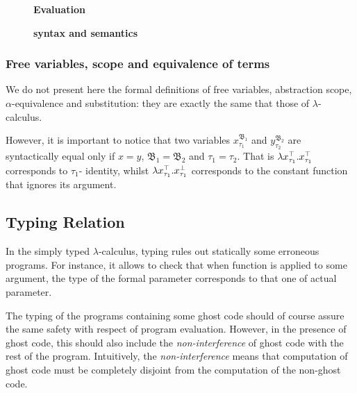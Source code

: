 \begin{figure}[H]
  	 \begin{flushright}  	 \textbf{Evaluation}  	 \end{flushright}
\caption{ \textbf{\glam syntax and semantics} \hfill}
\end{figure}

\subsubsection*{Free variables, scope and equivalence of terms} 
We do not present here the formal definitions of free variables, 
abstraction scope, $\alpha$-equivalence and substitution: they are exactly 
the same that those of $\lambda$-calculus.

However, it is important to notice that two variables $x^{\mathfrak{B_{1}}}_{\tau_{1}}$ and  
$y^{\mathfrak{B_{2}}}_{\tau_{2}}$ are syntactically equal only if 
$x = y$, $\mathfrak{B_{1}} = \mathfrak{B_{2}}$ and $ \tau_{1} = \tau_{2} $. That is  $\lambda x^{\top}_{\tau_{1}}. x^{\top}_{\tau_{1}}$ corresponds to $\tau_{1}$- identity, whilst  $\lambda x^{\top}_{\tau_{1}}. x^{\bot}_{\tau_{1}}$ corresponds to the constant function that ignores its argument. 

  
\subsection{Typing Relation}
In the simply typed $\lambda$-calculus, typing rules out  statically some erroneous programs. For instance, it allows to check that when function is applied to some argument, the type of the formal parameter corresponds to that one of actual parameter.

The typing of the programs containing some ghost code should of course 
assure the same safety with respect of program evaluation. However, in the presence of ghost code, this should also include the \textit{non-interference} of ghost code with the rest of the program. Intuitively, the \textit{non-interference} means that computation of ghost code must be completely disjoint from the computation of the non-ghost code. 

